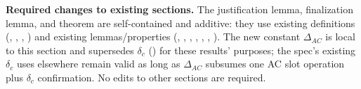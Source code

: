 \documentclass{article}
\renewcommand{\paragraph}[1]{\vspace{7pt}\noindent\textbf{#1}}
\theoremstyle{plain}
\theoremstyle{definition}
\theoremstyle{remark}
\begin{document}
\paragraph{Required changes to existing sections.}
The justification lemma, finalization lemma, and theorem are self-contained and additive: they use existing definitions (, , , ) and existing lemmas/properties (, , , , , , ). The new constant $\Delta_{\mathit{AC}}$ is local to this section and supersedes $\delta_c$ () for these results' purposes; the spec's existing $\delta_c$ uses elsewhere remain valid as long as $\Delta_{\mathit{AC}}$ subsumes one AC slot operation plus $\delta_c$ confirmation. No edits to other sections are required.
\end{document}
